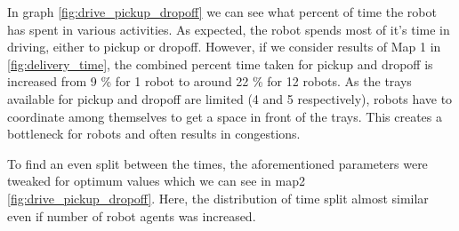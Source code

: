 \documentclass[journal]{IEEEtran}
\begin{document}
In graph \ref{fig:drive_pickup_dropoff} we can see what percent of time the robot has spent in various activities. As expected, the robot spends most of it's time in driving, either to pickup or dropoff. However, if we consider results of Map 1 in \ref{fig:delivery_time}, the combined percent time taken for pickup and dropoff is increased from 9 \% for 1 robot to around 22 \% for 12 robots.  As the trays available for pickup and dropoff are limited (4 and 5 respectively), robots have to coordinate among themselves to get a space in front of the trays. This creates a bottleneck for robots and often results in congestions. 


To find an even split between the times, the aforementioned parameters were  tweaked for optimum values which we can see in map2 \ref{fig:drive_pickup_dropoff}. Here, the distribution of time split almost similar even if number of robot agents was increased.  











%
%

\end{document}
